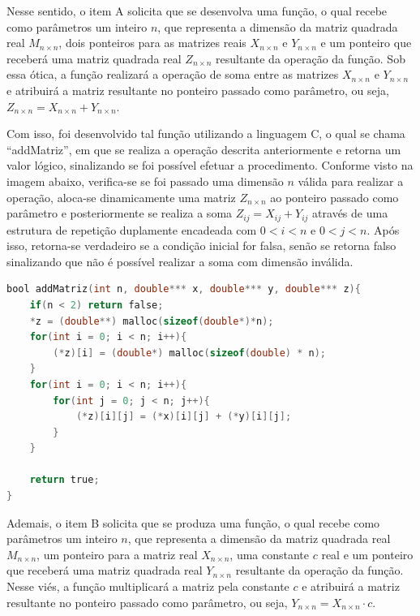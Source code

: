 \documentclass[
	12pt,				%
	oneside,			%
	a4paper,			%
	english,			%
	brazil				%
	]{abntex2ppgsi}
\begin{document}
Nesse sentido, o item A solicita que se desenvolva uma função, o qual recebe como parâmetros um inteiro $n$, que representa a dimensão da matriz quadrada real $M_{n \times n}$, dois ponteiros para as matrizes reais $X_{n \times n}$ e $Y_{n \times n}$ e um ponteiro que receberá uma matriz quadrada real $Z_{n \times n}$ resultante da operação da função. Sob essa ótica, a função realizará a operação de soma entre as matrizes $X_{n \times n}$ e $Y_{n \times n}$ e atribuirá a matriz resultante no ponteiro passado como parâmetro, ou seja, $Z_{n \times n}=X_{n \times n} + Y_{n \times n}$.

Com isso, foi desenvolvido tal função utilizando a linguagem C, o qual se chama “addMatriz”, em que se realiza a operação descrita anteriormente e retorna um valor lógico, sinalizando se foi possível efetuar a procedimento. Conforme visto na imagem abaixo, verifica-se se foi passado uma dimensão $n$ válida para realizar a operação, aloca-se dinamicamente uma matriz $Z_{n \times n}$ ao ponteiro passado como parâmetro e posteriormente se realiza a soma $Z_{ij}=X_{ij}+Y_{ij}$ através de uma estrutura de repetição duplamente encadeada com $0<i<n$ e $0<j<n$. Após isso, retorna-se verdadeiro se a condição inicial for falsa, senão se retorna falso sinalizando que não é possível realizar a soma com dimensão inválida.

\begin{lstlisting}[language=C, caption=Resolução de alto nível do exercício 27.A]
bool addMatriz(int n, double*** x, double*** y, double*** z){
    if(n < 2) return false;
    *z = (double**) malloc(sizeof(double*)*n);
    for(int i = 0; i < n; i++){
        (*z)[i] = (double*) malloc(sizeof(double) * n);
    }
    for(int i = 0; i < n; i++){
        for(int j = 0; j < n; j++){
            (*z)[i][j] = (*x)[i][j] + (*y)[i][j];
        }
    }

    return true;
}
\end{lstlisting}

Ademais, o item B solicita que se produza uma função, o qual recebe como parâmetros um inteiro $n$, que representa a dimensão da matriz quadrada real $M_{n \times n}$, um ponteiro para a matriz real $X_{n \times n}$, uma constante $c$ real e um ponteiro que receberá uma matriz quadrada real $Y_{n \times n}$ resultante da operação da função. Nesse viés, a função multiplicará a matriz  pela constante $c$ e atribuirá a matriz resultante no ponteiro passado como parâmetro, ou seja, $Y_{n \times n}= X_{n \times n} \cdot c$.
\end{document}

